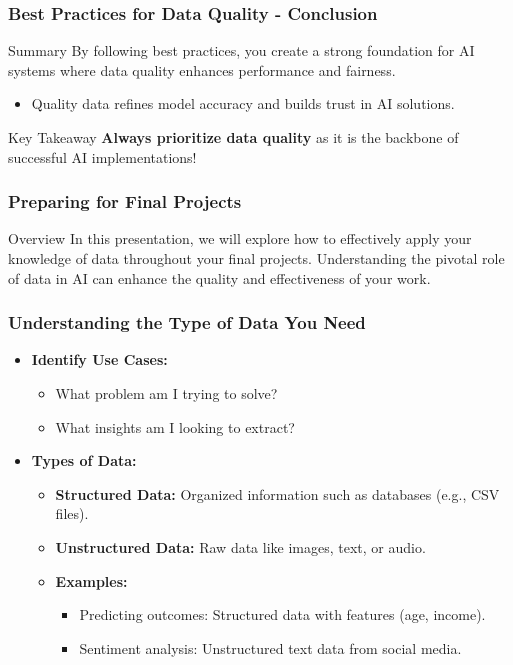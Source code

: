 \documentclass[aspectratio=169]{beamer}
\begin{document}
\begin{frame}[fragile]
    \frametitle{Best Practices for Data Quality - Conclusion}
    \begin{block}{Summary}
        By following best practices, you create a strong foundation for AI systems where data quality enhances performance and fairness. 
        \begin{itemize}
            \item Quality data refines model accuracy and builds trust in AI solutions.
        \end{itemize}
    \end{block}
    \begin{block}{Key Takeaway}
        \textbf{Always prioritize data quality} as it is the backbone of successful AI implementations!
    \end{block}
\end{frame}

\begin{frame}
    \frametitle{Preparing for Final Projects}
    \begin{block}{Overview}
        In this presentation, we will explore how to effectively apply your knowledge of data throughout your final projects. Understanding the pivotal role of data in AI can enhance the quality and effectiveness of your work.
    \end{block}
\end{frame}

\begin{frame}
    \frametitle{Understanding the Type of Data You Need}
    \begin{itemize}
        \item \textbf{Identify Use Cases:}
            \begin{itemize}
                \item What problem am I trying to solve?
                \item What insights am I looking to extract?
            \end{itemize}
        \item \textbf{Types of Data:}
            \begin{itemize}
                \item \textbf{Structured Data:} Organized information such as databases (e.g., CSV files).
                \item \textbf{Unstructured Data:} Raw data like images, text, or audio.
                \item \textbf{Examples:} 
                    \begin{itemize}
                        \item Predicting outcomes: Structured data with features (age, income).
                        \item Sentiment analysis: Unstructured text data from social media.
                    \end{itemize}
            \end{itemize}
    \end{itemize}
\end{frame}
\end{document}
